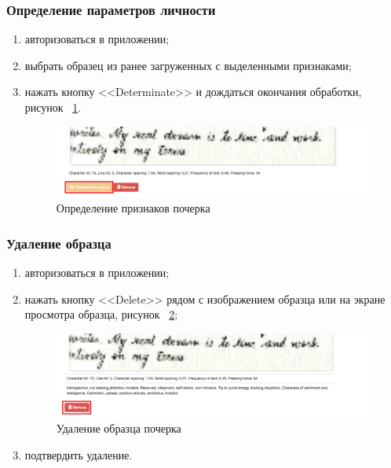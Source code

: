 \subsubsection{Определение параметров личности}
\label{sec:manpage:client_man:determ_nature}
\begin{enumerate}
    \item авторизоваться в приложении;
    \item выбрать образец из ранее загруженных с выделенными признаками;
    \item нажать кнопку <<Determinate>> и дождаться окончания обработки, рисунок ~\ref{fig:manpage:client_man:determinate_nature}.
        \begin{figure}[ht]
            \centering
            \includegraphics[width=0.6\textheight]{figures/determinate_nature.png}
            \caption{Определение признаков почерка}
            \label{fig:manpage:client_man:determinate_nature}
        \end{figure}
\end{enumerate}

\subsubsection{Удаление образца}
\label{sec:manpage:client_man:delete_sample}
\begin{enumerate}
    \item авторизоваться в приложении;
    \item нажать кнопку <<Delete>> рядом с изображением образца или на экране просмотра образца, рисунок ~\ref{fig:manpage:client_man:delete_sample};
        \begin{figure}[ht]
            \centering
            \includegraphics[width=0.4\textheight]{figures/delete_sample.png}
            \caption{Удаление образца почерка}
            \label{fig:manpage:client_man:delete_sample}
        \end{figure}
    \item подтвердить удаление.
\end{enumerate}